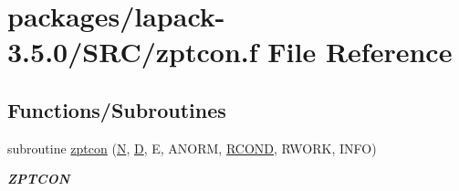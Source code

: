 \hypertarget{zptcon_8f}{}\section{packages/lapack-\/3.5.0/\+S\+R\+C/zptcon.f File Reference}
\label{zptcon_8f}
\subsection*{Functions/\+Subroutines}
\begin{DoxyCompactItemize}
\item 
subroutine \hyperlink{group__complex16PTcomputational_gae93ce2977fc454e3b4362e894d8b54df}{zptcon} (\hyperlink{polmisc_8c_a0240ac851181b84ac374872dc5434ee4}{N}, \hyperlink{odrpack_8h_a7dae6ea403d00f3687f24a874e67d139}{D}, E, A\+N\+O\+R\+M, \hyperlink{superlu__enum__consts_8h_af00a42ecad444bbda75cde1b64bd7e72a9b5c151728d8512307565994c89919d5}{R\+C\+O\+N\+D}, R\+W\+O\+R\+K, I\+N\+F\+O)
\begin{DoxyCompactList}\small\item\em {\bfseries Z\+P\+T\+C\+O\+N} \end{DoxyCompactList}\end{DoxyCompactItemize}
